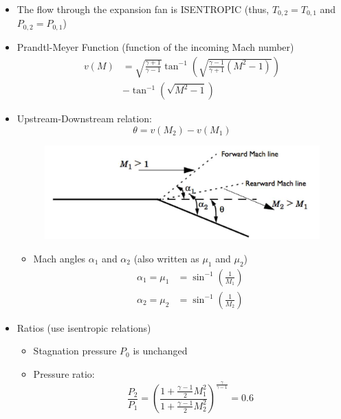 \begin{itemize}
    \item The flow through the expansion fan is {\color{blue}ISENTROPIC} (thus, $T_{0,2}=T_{0,1}$ and $P_{0,2}=P_{0,1}$)
    \item Prandtl-Meyer Function (function of the incoming Mach number)
    \begin{align*}
        v(M) &= \sqrt{\frac{\gamma+1}{\gamma-1}}\tan^{-1}\left(\sqrt{\frac{\gamma-1}{\gamma+1}(M^2-1)}\right) \\
        &- \tan^{-1}\left(\sqrt{M^2-1}\right)
    \end{align*}
    \item Upstream-Downstream relation:
    \begin{equation*}
        \theta = v(M_2) - v(M_1)
    \end{equation*}
    \begin{figure}[H]
        \centering
        \includegraphics[width=1.0\linewidth]{images/expansion_wave_up_downstream.png}
    \end{figure}
    \begin{itemize}
        \item Mach angles $\alpha_1$ and $\alpha_2$ (also written as $\mu_1$ and $\mu_2$)
        \begin{align*}
            \alpha_1 = \mu_1 &= \sin^{-1}\left(\frac{1}{M_1}\right) \\
            \alpha_2 = \mu_2 &= \sin^{-1}\left(\frac{1}{M_2}\right)
        \end{align*}
    \end{itemize}
    \item Ratios (use isentropic relations)
    \begin{itemize}
        \item Stagnation pressure $P_0$ is {\color{blue}unchanged}
        \item Pressure ratio:
        \begin{equation*}
            \frac{P_2}{P_1} = \left(\frac{1+\frac{\gamma-1}{2}M_1^2}{1+\frac{\gamma-1}{2}M_2^2}\right)^{\frac{\gamma}{\gamma-1}} = 0.6

\end{equation*}
\end{itemize}
\end{itemize}

